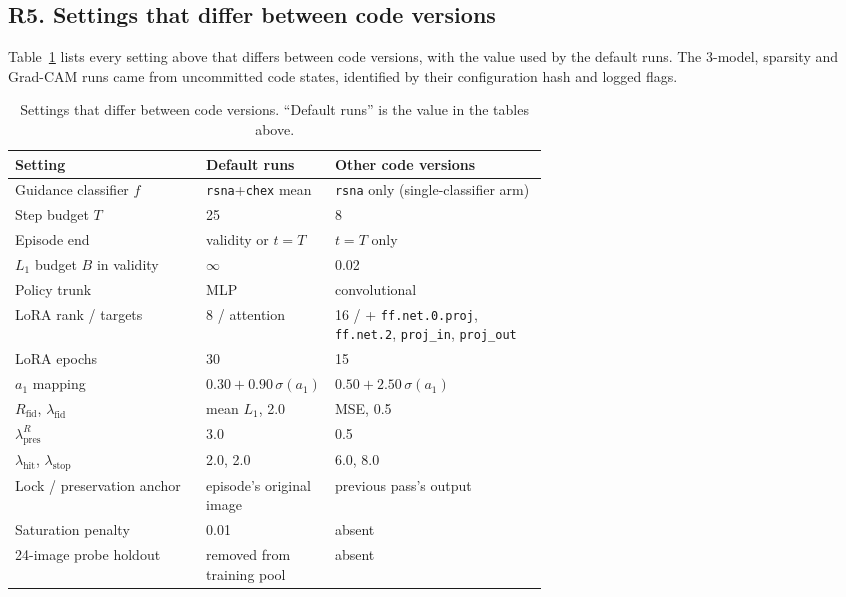\subsection*{R5. Settings that differ between code versions}
\label{sec:repro-changes}

Table~\ref{tab:repro-changes} lists every setting above that differs between code versions, with the value used by the default runs. The 3-model, sparsity and Grad-CAM runs came from uncommitted code states, identified by their configuration hash and logged flags.

\begin{table}[t]
\centering
\caption{Settings that differ between code versions. ``Default runs'' is the value in the tables above.}
\label{tab:repro-changes}
\small
\begin{tabular}{@{}l p{0.22\linewidth} p{0.40\linewidth}@{}}
\toprule
Setting & Default runs & Other code versions \\
\midrule
Guidance classifier $f$ & \texttt{rsna}+\texttt{chex} mean & \texttt{rsna} only (single-classifier arm) \\
Step budget $T$ & 25 & 8 \\
Episode end & validity or $t = T$ & $t = T$ only \\
$L_1$ budget $B$ in validity & $\infty$ & 0.02 \\
Policy trunk & MLP & convolutional \\
LoRA rank / targets & 8 / attention & 16 / + \texttt{ff.net.0.proj}, \texttt{ff.net.2}, \texttt{proj\_in}, \texttt{proj\_out} \\
LoRA epochs & 30 & 15 \\
$a_1$ mapping & $0.30 + 0.90\,\sigma(a_1)$ & $0.50 + 2.50\,\sigma(a_1)$ \\
$R_{\text{fid}}$, $\lambda_{\text{fid}}$ & mean $L_1$, 2.0 & MSE, 0.5 \\
$\lambda_{\text{pres}}^{R}$ & 3.0 & 0.5 \\
$\lambda_{\text{hit}}$, $\lambda_{\text{stop}}$ & 2.0, 2.0 & 6.0, 8.0 \\
Lock / preservation anchor & episode's original image & previous pass's output \\
Saturation penalty & 0.01 & absent \\
24-image probe holdout & removed from training pool & absent \\
\bottomrule
\end{tabular}
\end{table}

